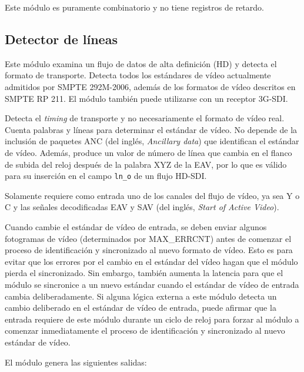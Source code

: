 Este módulo es puramente combinatorio y no tiene registros de retardo.


\subsection{Detector de líneas}

Este módulo examina un flujo de datos de alta definición (HD) y detecta el
formato de transporte. Detecta todos los estándares de vídeo actualmente
admitidos por SMPTE 292M-2006, además de los formatos de vídeo descritos en
SMPTE RP 211. El módulo también puede utilizarse con un receptor 3G-SDI\@.

Detecta el \textit{timing} de transporte y no necesariamente el formato de vídeo real.
Cuenta palabras y líneas para determinar el estándar de vídeo. No depende de la
inclusión de paquetes ANC (del inglés, \textit{Ancillary data}) que identifican el estándar de vídeo. Además, produce
un valor de número de línea que cambia en el flanco de subida del reloj después
de la palabra XYZ de la EAV, por lo que es válido para su inserción en el campo
\texttt{ln\_o} de un flujo HD-SDI\@.

Solamente requiere como entrada uno de los canales del flujo de vídeo, ya sea Y
o C y las señales decodificadas EAV y SAV (del inglés, \textit{Start of Active Video})\@.

Cuando cambie el estándar de vídeo de entrada, se deben enviar algunos fotogramas
de vídeo (determinados por MAX\_ERRCNT) antes de comenzar el proceso de
identificación y sincronizado al nuevo formato de vídeo. Esto es para evitar que los
errores por el cambio en el estándar del vídeo hagan que el módulo pierda el
sincronizado. Sin embargo, también aumenta la latencia para que el módulo se sincronice a
un nuevo estándar cuando el estándar de vídeo de entrada cambia deliberadamente.
Si alguna lógica externa a este módulo detecta un cambio deliberado
en el estándar de vídeo de entrada, puede afirmar que la entrada requiere de este
módulo durante un ciclo de reloj para forzar al módulo a comenzar inmediatamente
el proceso de identificación y sincronizado al nuevo estándar de vídeo.

El módulo genera las siguientes salidas:

